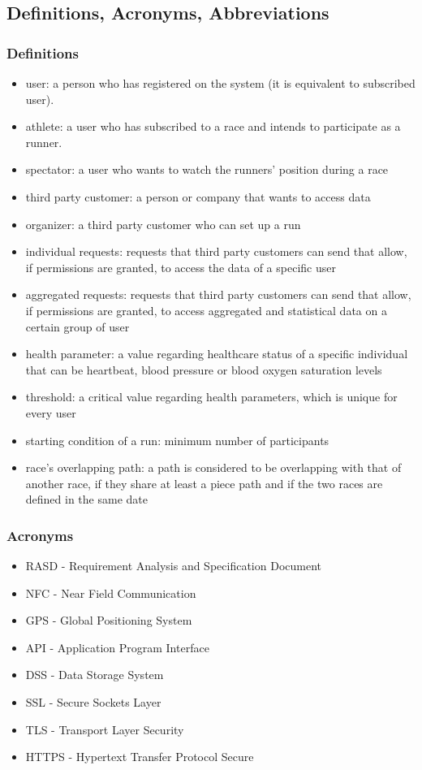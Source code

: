 \subsection{Definitions, Acronyms, Abbreviations}
\subsubsection{Definitions}
\begin{itemize}
\item user: a person who has registered on the system (it is equivalent to subscribed user).
\item athlete: a user who has subscribed to a race and intends to participate as a runner.
\item spectator: a user who wants to watch the runners' position during a race   
\item third party customer: a person or company that wants to access data
\item organizer: a third party customer who can set up a run
\item individual requests: requests that third party customers can send that allow, if permissions are granted, to access the data of a specific user
\item aggregated requests: requests that third party customers can send that allow, if permissions are granted, to access aggregated and statistical data on a certain group of user
\item health parameter: a value regarding healthcare status of a specific individual that can be heartbeat, blood pressure or blood oxygen saturation levels 
\item threshold: a critical value regarding health parameters, which is unique for every user
\item starting condition of a run: minimum number of participants
\item race's overlapping path: a path is considered to be overlapping with that of another race, if they share at least a piece path and if the two races are defined in the same date
\end{itemize}

\subsubsection{Acronyms}
\begin{itemize}
\item RASD - Requirement Analysis and Specification Document
\item NFC - Near Field Communication
\item GPS - Global Positioning System
\item API - Application Program Interface
\item DSS - Data Storage System
\item SSL - Secure Sockets Layer
\item TLS - Transport Layer Security
\item HTTPS - Hypertext Transfer Protocol Secure
\end{itemize}
